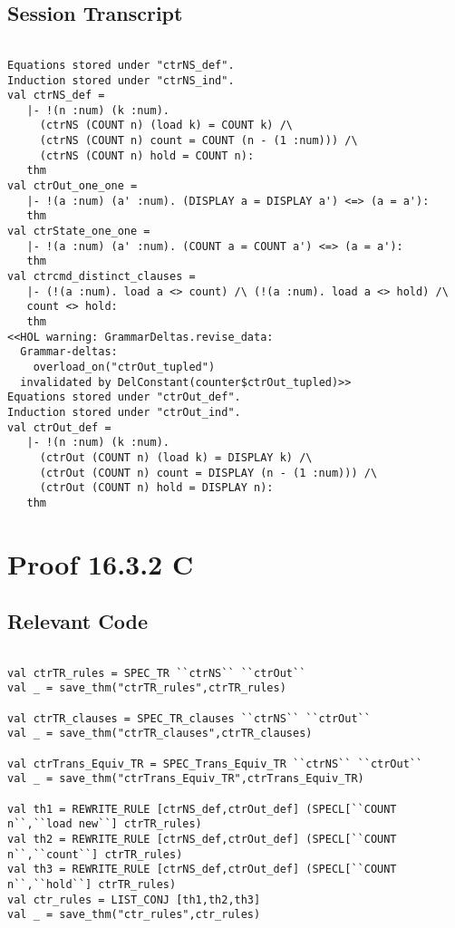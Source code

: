 \documentclass{report}
\begin{document}
\subsection{Session Transcript}
\label{trans5}
\begin{session}
  \begin{scriptsize}
\begin{verbatim}

Equations stored under "ctrNS_def".
Induction stored under "ctrNS_ind".
val ctrNS_def =
   |- !(n :num) (k :num).
     (ctrNS (COUNT n) (load k) = COUNT k) /\
     (ctrNS (COUNT n) count = COUNT (n - (1 :num))) /\
     (ctrNS (COUNT n) hold = COUNT n):
   thm
val ctrOut_one_one =
   |- !(a :num) (a' :num). (DISPLAY a = DISPLAY a') <=> (a = a'):
   thm
val ctrState_one_one =
   |- !(a :num) (a' :num). (COUNT a = COUNT a') <=> (a = a'):
   thm
val ctrcmd_distinct_clauses =
   |- (!(a :num). load a <> count) /\ (!(a :num). load a <> hold) /\
   count <> hold:
   thm
<<HOL warning: GrammarDeltas.revise_data: 
  Grammar-deltas:
    overload_on("ctrOut_tupled")
  invalidated by DelConstant(counter$ctrOut_tupled)>>
Equations stored under "ctrOut_def".
Induction stored under "ctrOut_ind".
val ctrOut_def =
   |- !(n :num) (k :num).
     (ctrOut (COUNT n) (load k) = DISPLAY k) /\
     (ctrOut (COUNT n) count = DISPLAY (n - (1 :num))) /\
     (ctrOut (COUNT n) hold = DISPLAY n):
   thm

\end{verbatim}
  \end{scriptsize}
\end{session}


\section{Proof 16.3.2 C}
\label{proof-6}

\subsection{Relevant Code}
\label{rel-code-6}
\begin{lstlisting}[frame=TBlr]

val ctrTR_rules = SPEC_TR ``ctrNS`` ``ctrOut``
val _ = save_thm("ctrTR_rules",ctrTR_rules)

val ctrTR_clauses = SPEC_TR_clauses ``ctrNS`` ``ctrOut``
val _ = save_thm("ctrTR_clauses",ctrTR_clauses)

val ctrTrans_Equiv_TR = SPEC_Trans_Equiv_TR ``ctrNS`` ``ctrOut``
val _ = save_thm("ctrTrans_Equiv_TR",ctrTrans_Equiv_TR)

val th1 = REWRITE_RULE [ctrNS_def,ctrOut_def] (SPECL[``COUNT n``,``load new``] ctrTR_rules)
val th2 = REWRITE_RULE [ctrNS_def,ctrOut_def] (SPECL[``COUNT n``,``count``] ctrTR_rules)
val th3 = REWRITE_RULE [ctrNS_def,ctrOut_def] (SPECL[``COUNT n``,``hold``] ctrTR_rules) 
val ctr_rules = LIST_CONJ [th1,th2,th3]
val _ = save_thm("ctr_rules",ctr_rules)

\end{lstlisting}
\end{document}
